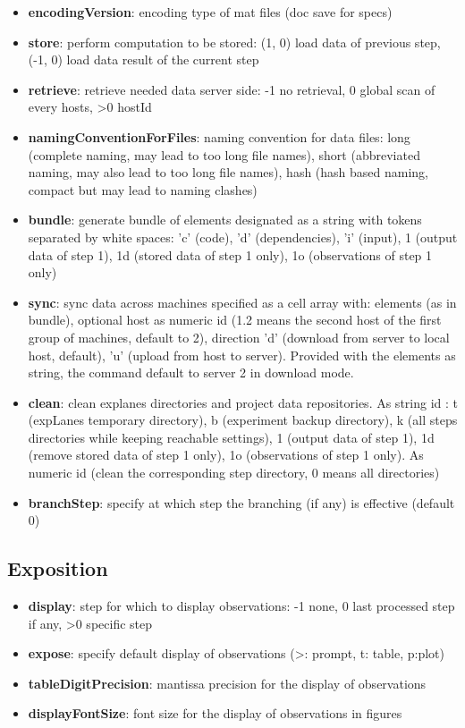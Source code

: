 \documentclass[a4paper,fleqn]{tufte-handout}
\begin{document}
\begin{itemize}
\item \textbf{encodingVersion}: encoding type of mat files (doc save for specs)
\item \textbf{store}: perform computation to be stored: (1, 0) load data of previous step, (-1, 0) load data result of the current step
\item \textbf{retrieve}: retrieve needed data server side: -1 no retrieval, 0 global scan of every hosts, >0 hostId
\item \textbf{namingConventionForFiles}: naming convention for data files: long (complete naming, may lead to too long file names), short (abbreviated naming, may also lead to too long file names), hash (hash based naming, compact but may lead to naming clashes)
\item \textbf{bundle}: generate bundle of elements designated as a string with tokens separated by white spaces: 'c' (code), 'd' (dependencies), 'i' (input), 1 (output data of step 1), 1d (stored data of step 1 only), 1o (observations of step 1 only) 
\item \textbf{sync}: sync data across machines specified as a cell array with: elements (as in bundle), optional host as numeric id (1.2 means the second host of the first group of machines, default to 2), direction 'd' (download from server to local host, default), 'u' (upload from host to server). Provided with the elements as string, the command default to server 2 in download mode.
\item \textbf{clean}: clean explanes directories and project data repositories. As string id : t (expLanes temporary directory), b (experiment backup directory), k (all steps directories while keeping reachable settings), 1 (output data of step 1), 1d (remove stored data of step 1 only), 1o (observations of step 1 only). As numeric id (clean the corresponding step directory, 0 means all directories) 
\item \textbf{branchStep}:  specify at which step the branching (if any) is effective (default 0)
\end{itemize}

\subsection{Exposition}

\begin{itemize}
\item \textbf{display}: step for which to display observations: -1 none, 0 last processed step if any, >0 specific step
\item \textbf{expose}: specify default display of observations (>: prompt, t: table, p:plot)
\item \textbf{tableDigitPrecision}: mantissa precision for the display of observations
\item \textbf{displayFontSize}: font size for the display of observations in figures
\end{itemize}
\end{document}
